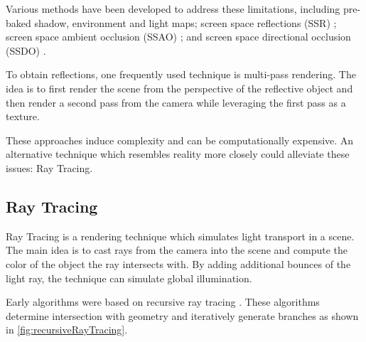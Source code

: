 Various methods have been developed to address these limitations, including pre-baked shadow, environment \cite{greene1986environment} and light maps; screen space reflections (SSR) \cite{screenSpaceReflectionsStackowiak}; screen space ambient occlusion (SSAO) \cite{bavoil2008ssao}; and screen space directional occlusion (SSDO) \cite{ritschel2009ssdo}.

To obtain reflections, one frequently used technique is multi-pass rendering. The idea is to first render the scene from the perspective of the reflective object and then render a second pass from the camera while leveraging the first pass as a texture.

These approaches induce complexity and can be computationally expensive. An alternative technique which resembles reality more closely could alleviate these issues: Ray Tracing.

\subsection{Ray Tracing}
\label{ch:rayTracingTheory}

Ray Tracing is a rendering technique which simulates light transport in a scene. The main idea is to cast rays from the camera into the scene and compute the color of the object the ray intersects with. By adding additional bounces of the light ray, the technique can simulate global illumination.

Early algorithms were based on recursive ray tracing \cite{whittedGlobalIllumination}. These algorithms determine intersection with geometry and iteratively generate branches as shown in \autoref{fig:recursiveRayTracing}.

